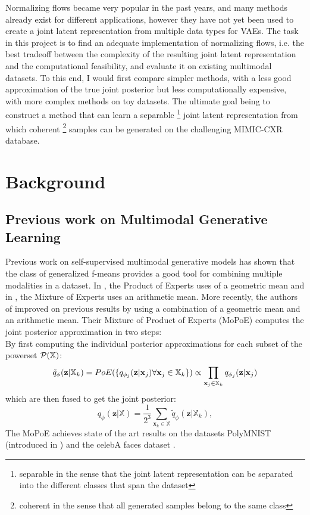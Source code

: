 \documentclass[english]{scrartcl}
\begin{document}
    Normalizing flows became very popular in the past years, and many methods already exist for different applications, however they have not yet been used to create a joint latent representation from multiple data types for VAEs.
    The task in this project is to find an adequate implementation of normalizing flows, i.e. the best tradeoff between the complexity of the resulting joint latent representation and the computational feasibility, and evaluate it on existing multimodal datasets.
    To this end, I would first compare simpler methods, with a less good approximation of the true joint posterior but less computationally expensive, with more complex methods on toy datasets.
    The ultimate goal being to construct a method that can learn a separable \footnote{separable in the sense that the joint latent representation can be separated into the different classes that span the dataset} joint latent representation from which coherent \footnote{coherent in the sense that all generated samples belong to the same class} samples can be generated on the challenging MIMIC-CXR \parencite{johnson_mimic-cxr-jpg_2019} database.


    \section{Background}

    \subsection{Previous work on Multimodal Generative Learning} \label{subsec:prevwork_mopoe}
    Previous work on self-supervised multimodal generative models has shown that the class of generalized f-means provides a good tool for combining multiple modalities in a dataset.
    In \citep[PoE]{wu_multimodal_2018}, the Product of Experts uses of a geometric mean and in \citep[MoE]{shi_variational_2019}, the Mixture of Experts uses an arithmetic mean.
    More recently, the authors of \citep[MoPoE]{sutter_generalized_2020} improved on previous results by using a combination of a geometric mean and an arithmetic mean.
    Their Mixture of Product of Experts (MoPoE) computes the joint posterior approximation in two steps:\\
    By first computing the individual posterior approximations for each subset of the powerset $\mathcal{P}(\mathbb{X})$:
    \begin{equation}
        \tilde{q}_{\phi}(\textbf{z}|\mathbb{X}_k)=PoE(\{q_{\phi_j}(\textbf{z}|\textbf{x}_j) \forall \textbf{x}_j \in \mathbb{X}_k\}) \propto \prod _{\textbf{x}_j \in \mathbb{X}_k}q_{\phi_j}(\textbf{z}|\textbf{x}_j)
    \end{equation}
    which are then fused to get the joint posterior:
    \begin{equation}
        q_{\phi}(\textbf{z}|\mathbb{X}) = \frac{1}{2^3} \sum _{\textbf{x}_k \in \mathbb{X}} \tilde{q}_{\phi} (\textbf{z}|\mathbb{X}_k),
    \end{equation}
    The MoPoE achieves state of the art results on the datasets PolyMNIST (introduced in \citet{sutter_multimodal_2020}) and the celebA faces dataset \citep{liu_deep_2015}.
\end{document}
